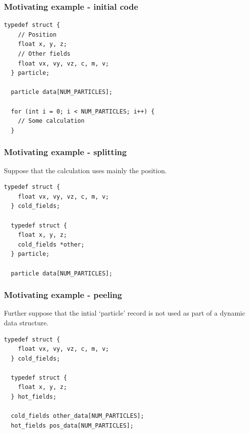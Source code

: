 \begin{frame}[fragile]
\frametitle{Motivating example - initial code}

\begin{lstlisting}[style=Cstyle]
  typedef struct {
    // Position
    float x, y, z;
    // Other fields
    float vx, vy, vz, c, m, v;
  } particle;
  
  particle data[NUM_PARTICLES];
  
  for (int i = 0; i < NUM_PARTICLES; i++) {
    // Some calculation
  }
\end{lstlisting}

\end{frame}


\begin{frame}[fragile]
\frametitle{Motivating example - splitting}

Suppose that the calculation uses mainly the position.

\bigskip

\begin{lstlisting}[style=Cstyle]
  typedef struct {
    float vx, vy, vz, c, m, v;
  } cold_fields;

  typedef struct {
    float x, y, z;
    cold_fields *other;
  } particle;
  
  particle data[NUM_PARTICLES];
\end{lstlisting}

\end{frame}


\begin{frame}[fragile]
\frametitle{Motivating example - peeling}

Further suppose that the intial `particle' record is not used as part of a dynamic data structure.

\begin{lstlisting}[style=Cstyle]
  typedef struct {
    float vx, vy, vz, c, m, v;
  } cold_fields;

  typedef struct {
    float x, y, z;
  } hot_fields;

  cold_fields other_data[NUM_PARTICLES];
  hot_fields pos_data[NUM_PARTICLES];
\end{lstlisting}

\end{frame}



